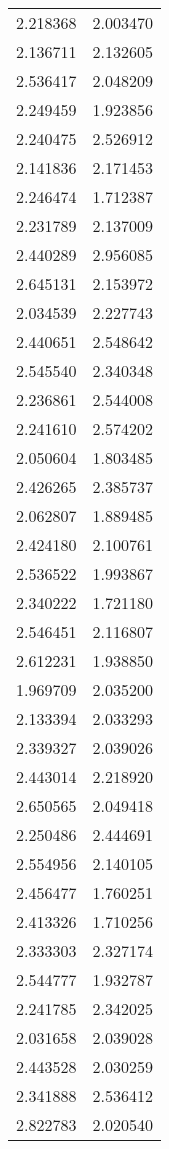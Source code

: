 \begin{longtable}[c]{ll}
    2.218368 & 2.003470 \\
    2.136711 & 2.132605 \\
    2.536417 & 2.048209 \\
    2.249459 & 1.923856 \\
    2.240475 & 2.526912 \\
    2.141836 & 2.171453 \\
    2.246474 & 1.712387 \\
    2.231789 & 2.137009 \\
    2.440289 & 2.956085 \\
    2.645131 & 2.153972 \\
    2.034539 & 2.227743 \\
    2.440651 & 2.548642 \\
    2.545540 & 2.340348 \\
    2.236861 & 2.544008 \\
    2.241610 & 2.574202 \\
    2.050604 & 1.803485 \\
    2.426265 & 2.385737 \\
    2.062807 & 1.889485 \\
    2.424180 & 2.100761 \\
    2.536522 & 1.993867 \\
    2.340222 & 1.721180 \\
    2.546451 & 2.116807 \\
    2.612231 & 1.938850 \\
    1.969709 & 2.035200 \\
    2.133394 & 2.033293 \\
    2.339327 & 2.039026 \\
    2.443014 & 2.218920 \\
    2.650565 & 2.049418 \\
    2.250486 & 2.444691 \\
    2.554956 & 2.140105 \\
    2.456477 & 1.760251 \\
    2.413326 & 1.710256 \\
    2.333303 & 2.327174 \\
    2.544777 & 1.932787 \\
    2.241785 & 2.342025 \\
    2.031658 & 2.039028 \\
    2.443528 & 2.030259 \\
    2.341888 & 2.536412 \\
    2.822783 & 2.020540 \\

\end{longtable}

